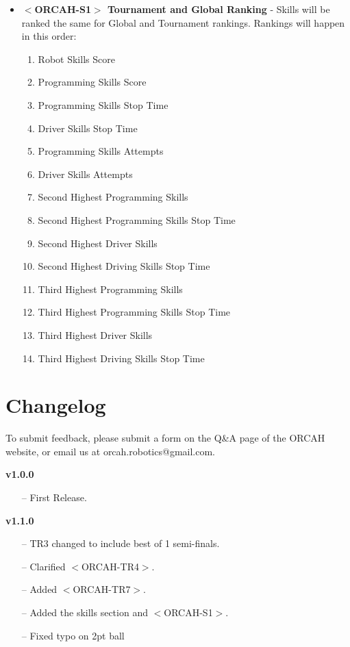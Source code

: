 \documentclass[letterpaper, 12pt]{article}
\begin{document}
\begin{itemize}[label={}]

\item\textbf{$<$ORCAH-S1$>$ Tournament and Global Ranking} - Skills will be ranked the same for Global and Tournament rankings.  Rankings will happen in this order:

\begin{enumerate}
\item Robot Skills Score
\item Programming Skills Score
\item Programming Skills Stop Time
\item Driver Skills Stop Time
\item Programming Skills Attempts
\item Driver Skills Attempts
\item Second Highest Programming Skills
\item Second Highest Programming Skills Stop Time
\item Second Highest Driver Skills
\item Second Highest Driving Skills Stop Time
\item Third Highest Programming Skills
\item Third Highest Programming Skills Stop Time
\item Third Highest Driver Skills
\item Third Highest Driving Skills Stop Time
\end{enumerate}

\end{itemize}

\newpage

\section*{Changelog}
To submit feedback, please submit a form on the Q\&A page of the ORCAH website, or email us at orcah.robotics@gmail.com.

\vspace{0.25in}

\noindent
\textbf{v1.0.0}

\begin{itemize}
\item[--] First Release.
\end{itemize}

\noindent
\textbf{v1.1.0}

\begin{itemize}
\item[--] TR3 changed to include best of 1 semi-finals.
\item[--] Clarified $<$ORCAH-TR4$>$.
\item[--] Added $<$ORCAH-TR7$>$.
\item[--] Added the skills section and $<$ORCAH-S1$>$.
\item[--] Fixed typo on 2pt ball
\end{itemize}
\end{document}
